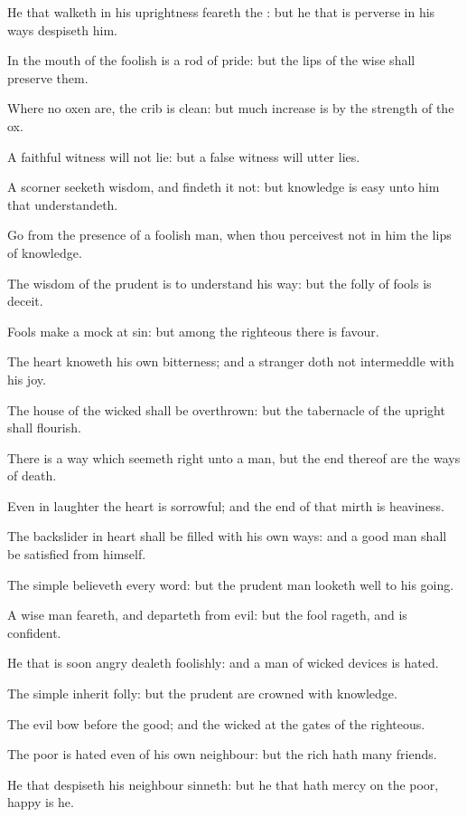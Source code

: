 \verse He that walketh in his uprightness feareth the \LORD: but he that is perverse in his ways despiseth him.

\verse In the mouth of the foolish is a rod of pride: but the lips of the wise shall preserve them.

\verse Where no oxen are, the crib is clean: but much increase is by the strength of the ox.

\verse A faithful witness will not lie: but a false witness will utter lies.

\verse A scorner seeketh wisdom, and findeth it not: but knowledge is easy unto him that understandeth.

\verse Go from the presence of a foolish man, when thou perceivest not in him the lips of knowledge.

\verse The wisdom of the prudent is to understand his way: but the folly of fools is deceit.

\verse Fools make a mock at sin: but among the righteous there is favour.

\verse The heart knoweth his own bitterness; and a stranger doth not intermeddle with his joy.

\verse The house of the wicked shall be overthrown: but the tabernacle of the upright shall flourish.

\verse There is a way which seemeth right unto a man, but the end thereof are the ways of death.

\verse Even in laughter the heart is sorrowful; and the end of that mirth is heaviness.

\verse The backslider in heart shall be filled with his own ways: and a good man shall be satisfied from himself.

\verse The simple believeth every word: but the prudent man looketh well to his going.

\verse A wise man feareth, and departeth from evil: but the fool rageth, and is confident.

\verse He that is soon angry dealeth foolishly: and a man of wicked devices is hated.

\verse The simple inherit folly: but the prudent are crowned with knowledge.

\verse The evil bow before the good; and the wicked at the gates of the righteous.

\verse The poor is hated even of his own neighbour: but the rich hath many friends.

\verse He that despiseth his neighbour sinneth: but he that hath mercy on the poor, happy is he.

